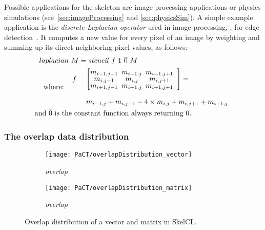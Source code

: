 Possible applications for the \stencil skeleton are image processing applications or physics simulations (see~\autoref{sec:imageProcessing} and \autoref{sec:physicsSim}).
A simple example application is the \emph{discrete Laplacian operator} used in image processing, \eg, for edge detection~\cite{Umbaugh1997}.
It computes a new value for every pixel of an image by weighting and summing up its direct neighboring pixel values, as follows:
\begin{align*}
  laplacian&\ M = \stencil\ f\ 1\ \overline{0}\ M\\
  \text{where:} \ \ &
  \begin{array}{ll}%
  f&\ \left[\begin{array}{ccc}%
      \hspace{-.5em} m_{i-1,j-1}& \hspace{-.5em} m_{i-1,j} & \hspace{-.5em}m_{i-1,j+1}\vspace{-.25em}\\%
      \hspace{-.5em} m_{i,j-1}  & \hspace{-.5em} m_{i,j}   & \hspace{-.5em}m_{i,j+1}  \vspace{-.25em}\\%
      \hspace{-.5em} m_{i+1,j-1}& \hspace{-.5em} m_{i+1,j} & \hspace{-.5em}m_{i+1,j+1}
    \end{array}\right] = \\[2em]
          &\ m_{i-1,j} + m_{i,j-1} - 4 \times m_{i,j} + m_{i,j+1} + m_{i+1,j}
  \end{array} \\
  \text{and } \overline{0} \text{ is th}&\text{e constant function always returning $0$.}
\end{align*}

\subsubsection{The overlap data distribution}
\label{section:overlap}

\begin{figure}[tb]
  \centering
  \begin{subfigure}[b]{.3\textwidth}
    \texttt{[image: PaCT/overlapDistribution\_vector]}
    \caption{\emph{overlap}}
    \label{fig:overlap_distribution:vector}
  \end{subfigure}
  \hspace{3em}
  \begin{subfigure}[b]{.22\textwidth}
    \texttt{[image: PaCT/overlapDistribution\_matrix]}
    \caption{\emph{overlap}}
    \label{fig:overlap_distribution:matrix}
  \end{subfigure}
  \caption{Overlap distribution of a vector and matrix in SkelCL.}
  \label{fig:overlap_distribution}
  \bigskip
\end{figure}

